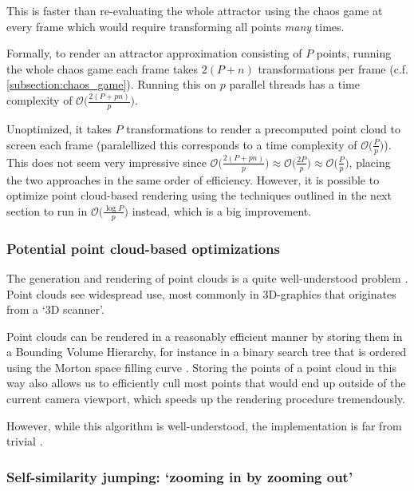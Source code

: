 \documentclass[11pt]{article}
\begin{document}
This is faster than re-evaluating the whole attractor using the chaos game at every frame which would require transforming all points \emph{many} times.

Formally, to render an attractor approximation consisting of \(P\) points, 
running the whole chaos game each frame takes \(2(P+n)\) transformations per frame (c.f. \autoref{subsection:chaos_game}). 
Running this on \(p\) parallel threads has a time complexity of \(\mathcal{O}\big(\frac{2(P+pn)}{p}\big)\).

Unoptimized, it takes \(P\) transformations to render a precomputed point cloud to screen each frame 
(paralellized this corresponds to a time complexity of \(\mathcal{O}\big(\frac{P}{p}\big)\)).
This does not seem very impressive since \(\mathcal{O}\big(\frac{2(P+pn)}{p}\big) \approx \mathcal{O}\big(\frac{2P}{p}\big) \approx \mathcal{O}\big(\frac{P}{p}\big)\),
placing the two approaches in the same order of efficiency. However, it is possible to optimize point cloud-based rendering using the techniques outlined in the next section
to run in \(\mathcal{O}\big(\frac{\log{P}}{p}\big)\) instead, which is a big improvement.

\subsubsection{Potential point cloud-based optimizations}
\label{sec:org11cf15f}
\label{subsection:point_cloud_optimizations}

The generation and rendering of point clouds is a quite well-understood problem \cite{wimmer2006instant}. 
Point clouds see widespread use,
most commonly in 3D-graphics that originates from a `3D scanner'.

Point clouds can be rendered in a reasonably efficient manner by storing them in a Bounding Volume Hierarchy,
for instance in a binary search tree that is ordered using the Morton space filling curve \cite{lauterbach2009construction}.
Storing the points of a point cloud in this way also allows us to efficiently cull most points that would end up outside of the current camera viewport,
which speeds up the rendering procedure tremendously.

However, while this algorithm is well-understood, the implementation is far from trivial \cite{lauterbach2009construction}.

\subsubsection{Self-similarity jumping: `zooming in by zooming out'}
\label{sec:org577a6a4}
\label{subsection:self_similarity}
\end{document}
